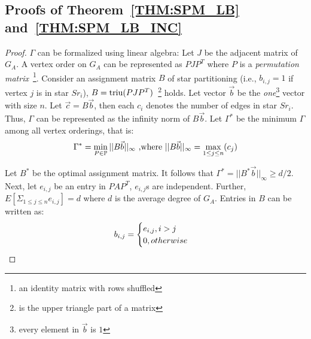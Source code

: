 \subsection{Proofs of Theorem~\ref{THM:SPM_LB} and~\ref{THM:SPM_LB_INC}}
\label{apx:thm2proof}
\vspace{-2mm}
\begin{proof}
$\Gamma$ can be formalized using linear algebra:
Let $J$ be the adjacent matrix of $G_A$.
A vertex order on $G_A$ can be represented as 
%
$PJP^T$
where $P$ %
is a %
\emph{permutation matrix}~\footnote{an identity matrix with rows shuffled}.
Consider an assignment matrix $B$ of star partitioning (i.e., $b_{i,j} = 1$ if vertex $j$ is in star $Sr_i$),
$B=\operatorname*{triu}(PJP^T)$~\footnote{ is the upper triangle part of a matrix} holds.
%
Let vector $\vec{b}$ be the \textit{one}\footnote{every element in $\vec{b}$ is $1$} 
vector with size $n$. Let $\vec{c} = B\vec{b}$, then each $c_i$ 
denotes the number of edges in star $Sr_i$. Thus, $\Gamma$ can be represented
as the infinity norm of $B\vec{b}$. Let $\Gamma^*$ be the minimum $\Gamma$ among all vertex orderings, that is:
\vspace{-1mm}
\begin{equation}
\vspace{-1mm}
\Gamma^* = \min_{P \in \mathbb{P}}{||B\vec{b}||_\infty} \text{ ,where } ||B\vec{b}||_\infty = \max_{1\leq j \leq n}(c_j)
\end{equation}

Let $B^*$ be the optimal assignment matrix. It follows that 
$\Gamma^*=||B^*\vec{b}||_\infty \geq d/2$.
Next, %
let $e_{i,j}$ be an entry in $PAP^T$,
$e_{i,j}$s are independent. Further, $E[\Sigma_{1\leq j \leq n}e_{i,j}]=d$ where $d$ is the average degree of $G_A$.
Entries in $B$ can be written as:
\vspace{-4mm}
\begin{equation*}
\vspace{-1mm}
b_{i,j} = \begin{cases}
			e_{i,j}, i>j \\
			0, otherwise
		  \end{cases}  
\end{equation*}


\end{proof}
